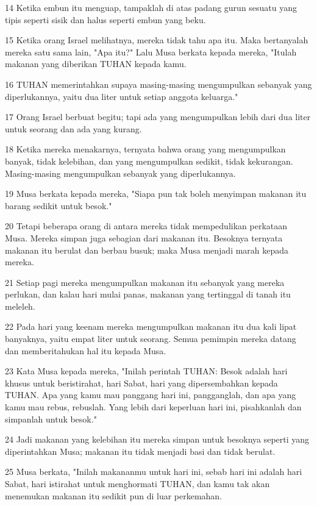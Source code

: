 \par 14 Ketika embun itu menguap, tampaklah di atas padang gurun sesuatu yang tipis seperti sisik dan halus seperti embun yang beku.
\par 15 Ketika orang Israel melihatnya, mereka tidak tahu apa itu. Maka bertanyalah mereka satu sama lain, "Apa itu?" Lalu Musa berkata kepada mereka, "Itulah makanan yang diberikan TUHAN kepada kamu.
\par 16 TUHAN memerintahkan supaya masing-masing mengumpulkan sebanyak yang diperlukannya, yaitu dua liter untuk setiap anggota keluarga."
\par 17 Orang Israel berbuat begitu; tapi ada yang mengumpulkan lebih dari dua liter untuk seorang dan ada yang kurang.
\par 18 Ketika mereka menakarnya, ternyata bahwa orang yang mengumpulkan banyak, tidak kelebihan, dan yang mengumpulkan sedikit, tidak kekurangan. Masing-masing mengumpulkan sebanyak yang diperlukannya.
\par 19 Musa berkata kepada mereka, "Siapa pun tak boleh menyimpan makanan itu barang sedikit untuk besok."
\par 20 Tetapi beberapa orang di antara mereka tidak mempedulikan perkataan Musa. Mereka simpan juga sebagian dari makanan itu. Besoknya ternyata makanan itu berulat dan berbau busuk; maka Musa menjadi marah kepada mereka.
\par 21 Setiap pagi mereka mengumpulkan makanan itu sebanyak yang mereka perlukan, dan kalau hari mulai panas, makanan yang tertinggal di tanah itu meleleh.
\par 22 Pada hari yang keenam mereka mengumpulkan makanan itu dua kali lipat banyaknya, yaitu empat liter untuk seorang. Semua pemimpin mereka datang dan memberitahukan hal itu kepada Musa.
\par 23 Kata Musa kepada mereka, "Inilah perintah TUHAN: Besok adalah hari khusus untuk beristirahat, hari Sabat, hari yang dipersembahkan kepada TUHAN. Apa yang kamu mau panggang hari ini, pangganglah, dan apa yang kamu mau rebus, rebuslah. Yang lebih dari keperluan hari ini, pisahkanlah dan simpanlah untuk besok."
\par 24 Jadi makanan yang kelebihan itu mereka simpan untuk besoknya seperti yang diperintahkan Musa; makanan itu tidak menjadi basi dan tidak berulat.
\par 25 Musa berkata, "Inilah makananmu untuk hari ini, sebab hari ini adalah hari Sabat, hari istirahat untuk menghormati TUHAN, dan kamu tak akan menemukan makanan itu sedikit pun di luar perkemahan.
